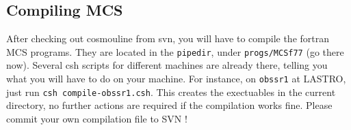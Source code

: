 \subsection{Compiling MCS}
After checking out cosmouline from svn, you will have to compile the fortran MCS programs. They are located in the \verb+pipedir+, under \verb+progs/MCSf77+ (go there now). Several csh scripts for different machines are already there, telling you what you will have to do on your machine. For instance, on \verb+obssr1+ at LASTRO, just run \verb+csh compile-obssr1.csh+. This creates the exectuables in the current directory, no further actions are required if the compilation works fine. Please commit your own compilation file to SVN !





%






